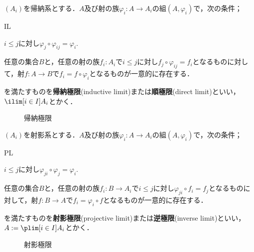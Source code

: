 \begin{defi}[帰納極限]
	$(A_i)$を帰納系とする．$A$及び射の族$\varphi_i:A\to A_i$の組$(A,\varphi_i)$で，次の条件；
	\begin{defiterm}{IL}
		\item $i\leq j$に対し$\varphi_j\circ \varphi_{ij}=\varphi_i$.
		\item 任意の集合$B$と，任意の射の族$f_i:A_i$で$i\leq j$に対し$f_j\circ\varphi_{ij}=f_i$となるものに対して，射$f:A\to B$で$f_i=f\circ\varphi_i$となるものが一意的に存在する．
	\end{defiterm}
	を満たすものを\textbf{帰納極限}(inductive limit)または\textbf{順極限}(direct limit)といい，$\ilim[i\in I]A_i$とかく．
\end{defi}
\begin{figure}[H]
	\centering
	\caption{帰納極限}
\end{figure}

\begin{defi}[射影極限]
	$(A_i)$を射影系とする．$A$及び射の族$\varphi_i:A\to A_i$の組$(A,\varphi_i)$で，次の条件；
	\begin{defiterm}{PL}
		\item $i\leq j$に対し$\varphi_{ji}\circ\varphi_j=\varphi_i$.
		\item 任意の集合$B$と，任意の射の族$f_i:B\to A_i$で$i\leq j$に対し$\varphi_{ji}\circ f_i=f_j$となるものに対して，射$f:B\to A$で$f_i=\varphi_i\circ f$となるものが一意的に存在する．
	\end{defiterm}
	を満たすものを\textbf{射影極限}(projective limit)または\textbf{逆極限}(inverse limit)といい，$A:=\plim[i\in I] A_i$とかく．
\end{defi}
\begin{figure}[H]
	\centering
	\caption{射影極限}
\end{figure}

